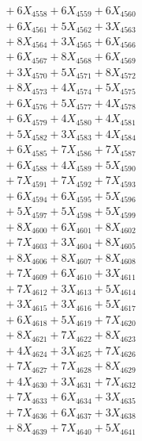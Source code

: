 \documentclass[a4paper,10pt]{article}
\begin{document}
{\begin{align}
&\;  + 6 X_{4558} + 6 X_{4559} + 6 X_{4560} \\[0.3ex]
&\;  + 6 X_{4561} + 5 X_{4562} + 3 X_{4563} \\[0.3ex]
&\;  + 8 X_{4564} + 3 X_{4565} + 6 X_{4566} \\[0.3ex]
&\;  + 6 X_{4567} + 8 X_{4568} + 6 X_{4569} \\[0.5ex]\allowbreak
&\;  + 3 X_{4570} + 5 X_{4571} + 8 X_{4572} \\[0.3ex]
&\;  + 8 X_{4573} + 4 X_{4574} + 5 X_{4575} \\[0.3ex]
&\;  + 6 X_{4576} + 5 X_{4577} + 4 X_{4578} \\[0.3ex]
&\;  + 6 X_{4579} + 4 X_{4580} + 4 X_{4581} \\[0.3ex]
&\;  + 5 X_{4582} + 3 X_{4583} + 4 X_{4584} \\[0.3ex]
&\;  + 6 X_{4585} + 7 X_{4586} + 7 X_{4587} \\[0.3ex]
&\;  + 6 X_{4588} + 4 X_{4589} + 5 X_{4590} \\[0.3ex]
&\;  + 7 X_{4591} + 7 X_{4592} + 7 X_{4593} \\[0.3ex]
&\;  + 6 X_{4594} + 6 X_{4595} + 5 X_{4596} \\[0.3ex]
&\;  + 5 X_{4597} + 5 X_{4598} + 5 X_{4599} \\[0.5ex]\allowbreak
&\;  + 8 X_{4600} + 6 X_{4601} + 8 X_{4602} \\[0.3ex]
&\;  + 7 X_{4603} + 3 X_{4604} + 8 X_{4605} \\[0.3ex]
&\;  + 8 X_{4606} + 8 X_{4607} + 8 X_{4608} \\[0.3ex]
&\;  + 7 X_{4609} + 6 X_{4610} + 3 X_{4611} \\[0.3ex]
&\;  + 7 X_{4612} + 3 X_{4613} + 5 X_{4614} \\[0.3ex]
&\;  + 3 X_{4615} + 3 X_{4616} + 5 X_{4617} \\[0.3ex]
&\;  + 6 X_{4618} + 5 X_{4619} + 7 X_{4620} \\[0.3ex]
&\;  + 8 X_{4621} + 7 X_{4622} + 8 X_{4623} \\[0.3ex]
&\;  + 4 X_{4624} + 3 X_{4625} + 7 X_{4626} \\[0.3ex]
&\;  + 7 X_{4627} + 7 X_{4628} + 8 X_{4629} \\[0.5ex]\allowbreak
&\;  + 4 X_{4630} + 3 X_{4631} + 7 X_{4632} \\[0.3ex]
&\;  + 7 X_{4633} + 6 X_{4634} + 3 X_{4635} \\[0.3ex]
&\;  + 7 X_{4636} + 6 X_{4637} + 3 X_{4638} \\[0.3ex]
&\;  + 8 X_{4639} + 7 X_{4640} + 5 X_{4641} \\[0.3ex]

\end{align}}
\end{document}
